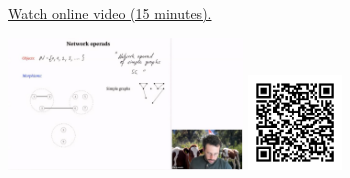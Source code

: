 
\begin{minipage}{10cm}
    \href{https://act4e-spring21.netlify.app/videos/spring2021-operads-b:network-operad.html}{Watch online video (15 minutes).}
        
    \href{https://act4e-spring21.netlify.app/videos/spring2021-operads-b:network-operad.html}{\includegraphics[height=3.5cm]{spring2021-operads-b:network-operad/thumbnails.jpg}}
    \href{https://act4e-spring21.netlify.app/videos/spring2021-operads-b:network-operad.html}{\includegraphics[height=2.5cm]{spring2021-operads-b:network-operad/qrcode.png}}
\end{minipage}
